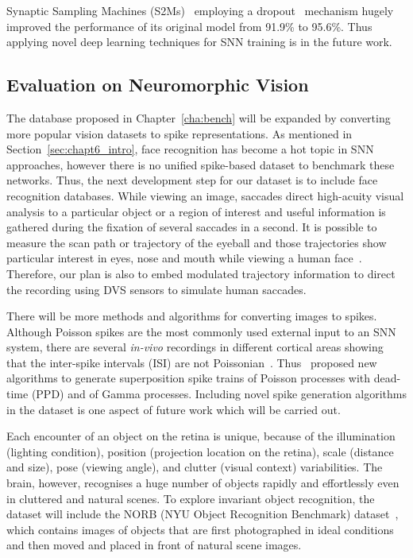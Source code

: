 Synaptic Sampling Machines (S2Ms)~\cite{neftci2016stochastic} employing a dropout~\cite{srivastava2014dropout} mechanism hugely improved the performance of its original model from 91.9\% to 95.6\%.
Thus applying novel deep learning techniques for SNN training is in the future work.


\subsection{Evaluation on Neuromorphic Vision}
The database proposed in Chapter~\ref{cha:bench} will be expanded by converting more popular vision datasets to spike representations.
As mentioned in Section~\ref{sec:chapt6_intro}, face recognition has become a hot topic in SNN approaches, however there is no unified spike-based dataset to benchmark these networks.
Thus, the next development step for our dataset is to include face recognition databases.
While viewing an image, saccades direct high-acuity visual analysis to a particular object or a region of interest and useful information is gathered during the fixation of several saccades in a second.
It is possible to measure the scan path or trajectory of the eyeball and those trajectories show particular interest in eyes, nose and mouth while viewing a human face~\cite{yarbus1967eye}.
Therefore, our plan is also to embed modulated trajectory information to direct the recording using DVS sensors to simulate human saccades.

There will be more methods and algorithms for converting images to spikes.
Although Poisson spikes are the most commonly used external input to an SNN system, there are several \textit{in-vivo} recordings in different cortical areas showing that the inter-spike intervals (ISI) are not Poissonian~\cite{deger2012statistical}. 
Thus~\cite{deger2012statistical} proposed new algorithms to generate superposition spike trains of Poisson processes with dead-time (PPD) and of Gamma processes.
Including novel spike generation algorithms in the dataset is one aspect of future work which will be carried out.

Each encounter of an object on the retina is unique, because of the illumination (lighting condition), position (projection location on the retina), scale (distance and size), pose (viewing angle), and clutter (visual context) variabilities.
The brain, however, recognises a huge number of objects rapidly and effortlessly even in cluttered and natural scenes.
To explore invariant object recognition, the dataset will include the NORB (NYU Object Recognition Benchmark) dataset~\cite{lecun2004learning}, which contains images of objects that are first photographed in ideal conditions and then moved and placed in front of natural scene images.

